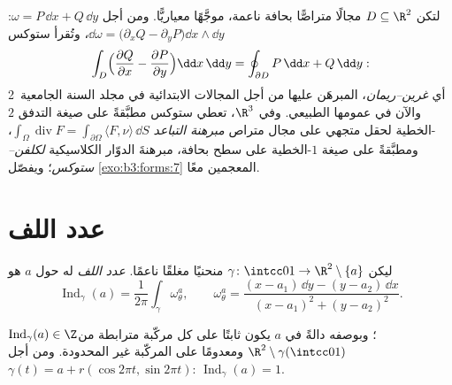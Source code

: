 \begin{example}
\label{ex:b3:forms:classical}
لتكن $D \subseteq \R^2$ مجالًا متراصًّا بحافة ناعمة، موجَّهًا معياريًّا.
ومن أجل $\omega = P\,\dd x +
Q\,\dd y$: $\dd\omega = \bigl(\partial_xQ -
\partial_yP\bigr)\dd x\wedge\dd y$، وتُقرأ ستوكس
\[
\int_D\Bigl(\frac{\partial Q}{\partial x} -
\frac{\partial P}{\partial y}\Bigr)\dd x\,\dd y
= \oint_{\partial D}P\,\dd x + Q\,\dd y :
\]
أي \emph{غرين--ريمان}، المبرهَن عليها من أجل المجالات الابتدائية
في مجلد السنة الجامعية~2 والآن في عمومها الطبيعي. وفي $\R^3$،
تعطي ستوكس مطبَّقةً على صيغة التدفق $2$-الخطية لحقل متجهي على
مجال متراص \emph{مبرهنة التباعد} $\int_\Omega\operatorname{div}F =
\int_{\partial\Omega}\langle F, \nu\rangle\,\dd S$، ومطبَّقةً على صيغة
$1$-الخطية على سطح بحافة، مبرهنةَ الدوّار الكلاسيكية
\emph{لكلفن--ستوكس}؛ ويفصّل \cref{exo:b3:forms:7} المعجمين معًا.
\end{example}

\section{عدد اللف}\label{sec:b3:forms:winding}

\begin{definition}\label{def:b3:forms:winding}
ليكن $\gamma\colon\intcc01\to\R^2\setminus\{a\}$ منحنيًا مغلقًا ناعمًا. \emph{عدد اللف} له حول $a$ هو
\[
\operatorname{Ind}_\gamma(a) =
\frac1{2\pi}\int_\gamma\omega_\theta^a,
\qquad
\omega_\theta^a = \frac{(x - a_1)\,\dd y - (y - a_2)\,\dd
x}{(x - a_1)^2 + (y - a_2)^2} .
\]
\end{definition}

\begin{proposition}\label{prop:b3:forms:windinginteger}
$\operatorname{Ind}_\gamma(a) \in \Z$؛ وبوصفه دالةً في $a$ يكون ثابتًا على كل مركّبة مترابطة
من $\R^2\setminus\gamma(\intcc01)$ ومعدومًا على المركّبة غير المحدودة. ومن أجل $\gamma(t) = a + r(\cos2\pi t, \sin2\pi t)$:
$\operatorname{Ind}_\gamma(a) = 1$.
\end{proposition}

